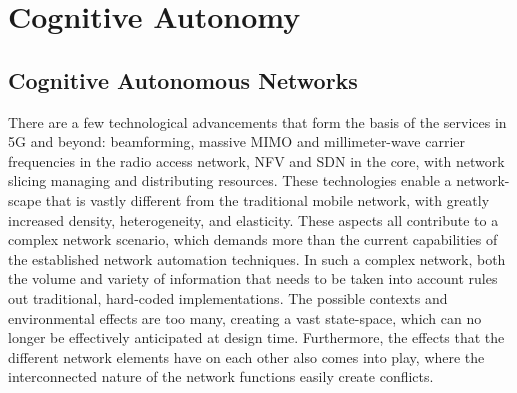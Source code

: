 	\section{Cognitive Autonomy}
	
		\subsection{Cognitive Autonomous Networks}
		
			There are a few technological advancements that form the basis of the services in \ac{5G} and beyond: beamforming, massive \ac{MIMO} and millimeter-wave carrier frequencies in the radio access network, \ac{NFV} and \ac{SDN} in the core, with network slicing managing and distributing resources.	
			These technologies enable a network-scape that is vastly different from the traditional mobile network, with greatly increased density, heterogeneity, and elasticity.
			These aspects all contribute to a complex network scenario, which demands more than the current capabilities of the established network automation techniques.			
			In such a complex network, both the volume and variety of information that needs to be taken into account rules out traditional, hard-coded implementations.
			The possible contexts and environmental effects are too many, creating a vast state-space, which can no longer be effectively anticipated at design time.
			Furthermore, the effects that the different network elements have on each other also comes into play, where the interconnected nature of the network functions easily create conflicts.
			
